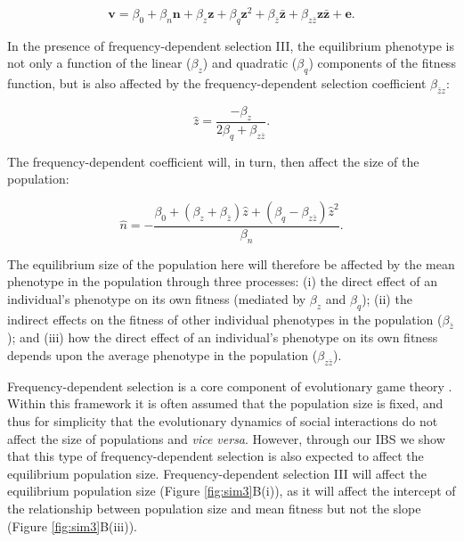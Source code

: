 \documentclass{article}
\begin{document}
	\begin{equation} \label{eq: fitness_S6}
	\bm{v}=\beta_{0} +\beta_{n} \bm{n} + \beta_{z} \bm{z} + \beta_{q} \bm{z}^2 +   \beta_{\bar{z}} \bm{\bar{z}}  + \beta_{z\bar{z}} \bm{z\bar{z}}  +  \bm{e}.
	\end{equation}
	
	\noindent In the presence of frequency-dependent selection III, the equilibrium phenotype is not only a function of the linear ($\beta_{z}$) and quadratic ($\beta_{q}$) components of the fitness function, but is also affected by the frequency-dependent selection coefficient $\beta_{\bar{z}z}$:
	
	\begin{equation} \label{eq: eq_z_S6}
	\hat{z}=\frac{-\beta_{z}}{2\beta_{q} + \beta_{z\bar{z}}}.
	\end{equation} 
	
	\noindent The frequency-dependent coefficient will, in turn, then affect the size of the population:
	
	\begin{equation} \label{eq: eq_N_S6}
	\hat{n} = -\frac{\beta_{0}+ (\beta_{z}   + \beta_{\bar{z}})\hat{z} + (\beta_{q} - \beta_{z\bar{z}})\hat{z}^2}{\beta_{n}}.
	\end{equation}
	
	\noindent The equilibrium size of the population here will therefore be affected by the mean phenotype in the population through three processes: (i) the direct effect of an individual's phenotype on its own fitness (mediated by $\beta_z$ and $ \beta_q$); (ii) the indirect effects on the fitness of other individual phenotypes in the population ($\beta_{\bar{z}}$); and (iii) how the direct effect of an individual's phenotype on its own fitness depends upon the average phenotype in the population ($\beta_{z\bar{z}}$). 
	
	Frequency-dependent selection is a core component of evolutionary game theory \citep{MaynardSmith1982}. Within this framework it is often assumed that the population size is fixed, and thus for simplicity that the evolutionary dynamics of social interactions do not affect the size of populations and  \textit{vice versa}. However, through our IBS we show that this type of frequency-dependent selection is also expected to affect the equilibrium population size. Frequency-dependent selection III will affect the equilibrium population size (Figure \ref{fig:sim3}B(i)), as it will affect the intercept of the relationship between population size and mean fitness but not the slope (Figure \ref{fig:sim3}B(iii)). 
	
\end{document}
